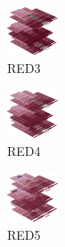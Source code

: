 \hspace{0.1cm}
\begin{minipage}[b]{0.15\linewidth}
\begin{figure}[H]                                                          
  \centering                                                             
  \begin{adjustbox}{width=1.5cm,center}                                   
  \includegraphics[width=1.5cm]{src/colorspace_colourflow/flows/colourflow_67-45.png}%
  \end{adjustbox}                                                        
\caption*{RED3}                                           
\end{figure}                                                               
\end{minipage}
\hspace{0.1cm}
\begin{minipage}[b]{0.15\linewidth}
\begin{figure}[H]                                                          
  \centering                                                             
  \begin{adjustbox}{width=1.5cm,center}                                   
  \includegraphics[width=1.5cm]{src/colorspace_colourflow/flows/colourflow_68-45.png}%
  \end{adjustbox}                                                        
\caption*{RED4}                                           
\end{figure}                                                               
\end{minipage}
\hspace{0.1cm}
\begin{minipage}[b]{0.15\linewidth}
\begin{figure}[H]                                                          
  \centering                                                             
  \begin{adjustbox}{width=1.5cm,center}                                   
  \includegraphics[width=1.5cm]{src/colorspace_colourflow/flows/colourflow_69-45.png}%
  \end{adjustbox}                                                        
\caption*{RED5}                                           
\end{figure}                                                               
\end{minipage}
